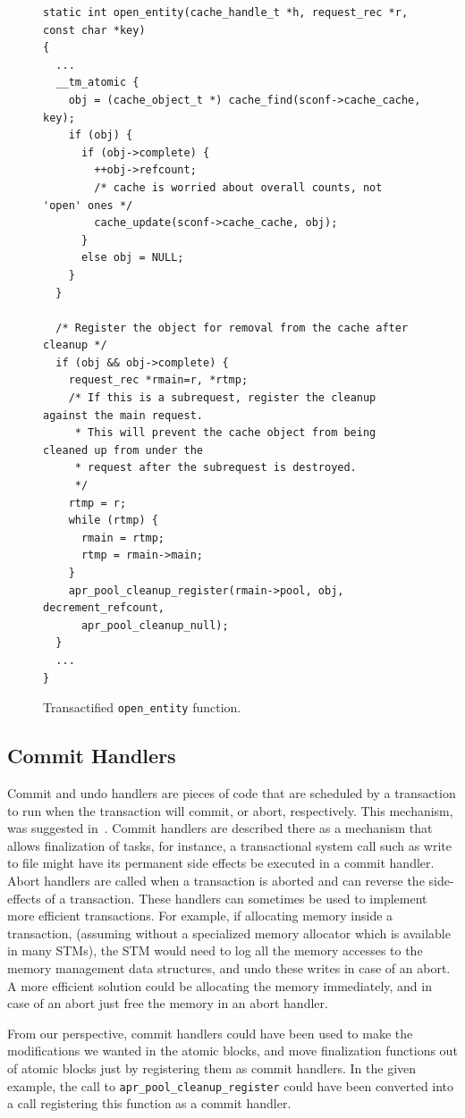 \documentclass[preprint,natbib,11pt]{sigplanconf}
\begin{document}
\begin{figure}
\begin{lstlisting}
static int open_entity(cache_handle_t *h, request_rec *r, const char *key)
{
  ...
  __tm_atomic {
    obj = (cache_object_t *) cache_find(sconf->cache_cache, key);
    if (obj) {
      if (obj->complete) {
        ++obj->refcount;
        /* cache is worried about overall counts, not 'open' ones */
        cache_update(sconf->cache_cache, obj);
      }
      else obj = NULL;
    }
  }

  /* Register the object for removal from the cache after cleanup */
  if (obj && obj->complete) {
    request_rec *rmain=r, *rtmp;
    /* If this is a subrequest, register the cleanup against the main request.
     * This will prevent the cache object from being cleaned up from under the
     * request after the subrequest is destroyed.
     */
    rtmp = r;
    while (rtmp) {
      rmain = rtmp;
      rtmp = rmain->main;
    }
    apr_pool_cleanup_register(rmain->pool, obj, decrement_refcount, 
      apr_pool_cleanup_null);
  }
  ...
}
\end{lstlisting}
\caption{Transactified {\tt open\_entity} function.}
\label{code:transactified-open-entity}
\end{figure}

\subsection{Commit Handlers}
Commit and undo handlers are pieces of code that are scheduled by a transaction
to run when the transaction will commit, or abort, respectively. This mechanism,
was suggested in~\cite{tm:commit-handlers}.  Commit handlers are described
there as a mechanism that allows finalization of tasks, for instance, a
transactional system call such as write to file might have its permanent side
effects be executed in a commit handler. 
Abort handlers are called when a transaction is aborted and can reverse the 
side-effects of a transaction. These handlers can sometimes be used to implement
more efficient transactions. For example, if allocating memory inside a
transaction, (assuming without a specialized memory allocator which is available
in many STMs), the STM would need to log all the memory accesses to the memory
management data structures, and undo these writes in case of an abort. A more
efficient solution could be allocating the memory immediately, and in case of an
abort just free the memory in an abort handler.

From our perspective, commit handlers could have been used to make the
modifications we wanted in the atomic blocks, and move finalization functions
out of atomic blocks just by registering them as commit handlers. In the given
example, the call to {\tt apr\_pool\_cleanup\_register} could have been
converted into a call registering this function as a commit handler.
\end{document}
